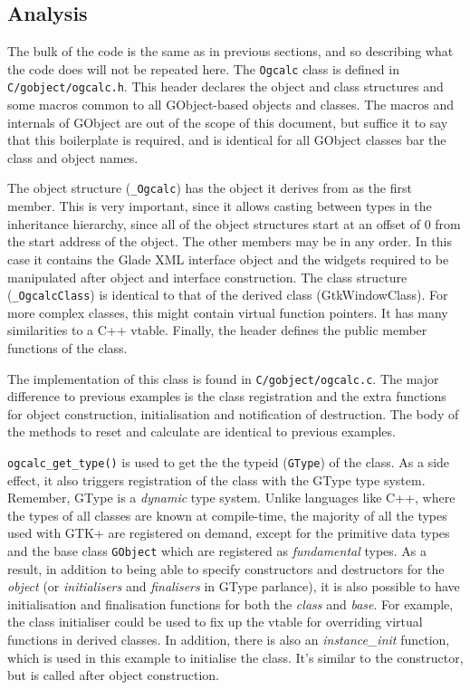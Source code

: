 \documentclass[a4paper,oneside]{article}
\newcommand{\filename}[1]{\texttt{#1}}
\newcommand{\variable}[1]{\textsl{#1}}
\newcommand{\class}[1]{\texttt{#1}}
\newcommand{\function}[1]{\texttt{#1()}}
\newcommand{\type}[1]{\texttt{#1}}
\begin{document}
\subsection{Analysis}

The bulk of the code is the same as in previous sections, and so
describing what the code does will not be repeated here.  The
\class{Ogcalc} class is defined in \filename{C/gobject/ogcalc.h}.
This header declares the object and class structures and some macros
common to all GObject-based objects and classes.  The macros and
internals of GObject are out of the scope of this document, but
suffice it to say that this boilerplate is required, and is identical
for all GObject classes bar the class and object names.

The object structure (\class{\_Ogcalc}) has the object it derives from
as the first member.  This is very important, since it allows casting
between types in the inheritance hierarchy, since all of the object
structures start at an offset of 0 from the start address of the
object.  The other members may be in any order.  In this case it
contains the Glade XML interface object and the widgets required to be
manipulated after object and interface construction.  The class
structure (\class{\_OgcalcClass}) is identical to that of the derived
class (GtkWindowClass).  For more complex classes, this might contain
virtual function pointers.  It has many similarities to a C++ vtable.
Finally, the header defines the public member functions of the class.

The implementation of this class is found in
\filename{C/gobject/ogcalc.c}.  The major difference to previous
examples is the class registration and the extra functions for object
construction, initialisation and notification of destruction.  The
body of the methods to reset and calculate are identical to previous
examples.

\function{ogcalc\_get\_type} is used to get the the typeid
(\type{GType}) of the class.  As a side effect, it also triggers
registration of the class with the GType type system.  Remember, GType
is a \emph{dynamic} type system.  Unlike languages like C++, where the
types of all classes are known at compile-time, the majority of all
the types used with GTK+ are registered on demand, except for the
primitive data types and the base class \class{GObject} which are
registered as \emph{fundamental} types.  As a result, in addition to
being able to specify constructors and destructors for the
\emph{object} (or \emph{initialisers} and \emph{finalisers} in GType
parlance), it is also possible to have initialisation and finalisation
functions for both the \emph{class} and \emph{base}.  For example, the
class initialiser could be used to fix up the vtable for overriding
virtual functions in derived classes.  In addition, there is also an
\variable{instance\_init} function, which is used in this example to
initialise the class.  It's similar to the constructor, but is called
after object construction.
\end{document}
